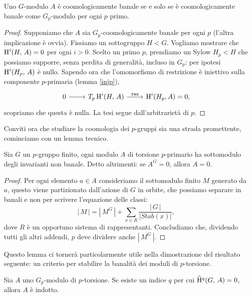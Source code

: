 \begin{lemma}\label{banSylow}
	Uno $ G $-modulo $ A $ è coomologicamente banale se e solo se è coomologicamente banale come $ G_p $-modulo per ogni $ p $ primo.
\end{lemma}
\begin{proof}
	Supponiamo che $ A $ sia $ G_p $-coomologicamente banale per ogni $ p $ (l'altra implicazione è ovvia). Fissiamo un sottogruppo $ H < G $. Vogliamo mostrare che
	$  \operatorname{H}^i(H, \, A) = 0 $ per ogni $ i > 0 $. Scelto un primo $ p $, prendiamo un Sylow $ H_p < H $ che possiamo supporre, senza perdita di generalità, incluso in $ G_p $: per ipotesi $ \operatorname{H}^i(H_p, \, A) $ è nullo.
	Sapendo ora che l'omomorfismo di restrizione è iniettivo sulla componente $ p $-primaria (lemma \ref{injp}),
	$$ \begin{tikzcd}
	0 \rar & T_p\HH^i(H, \, A) \rar["\Res"] & \HH^i(H_p, A) = 0,
	\end{tikzcd}  $$
	scopriamo che questa è nulla. La tesi segue dall'arbitrarietà di $ p $.
\end{proof}

Conviti ora che studiare la coomologia dei $ p $-gruppi sia una strada promettente, 
cominciamo con un lemma tecnico.

\begin{lemma}\label{ban1}
	Sia $ G $ un $ p $-gruppo finito, ogni modulo $ A $ di torsione $ p $-primario ha sottomodulo degli invarianti non banale. Detto altrimenti: se $ A^G = 0 $, allora $ A = 0 $.
\end{lemma}
\begin{proof}
	Per ogni elemento $ a \in A $ consideriamo il sottomodulo finito $ M $ generato da $ a $, questo viene partizionato dall'azione di $ G $ in orbite, che possiamo separare in banali e non per scrivere l'equazione delle classi:
	\[ |\,M\,| = |\, M^G\,| +\sum_{x \in R} \frac{|\,G\,|}{|Stab(x)|},  \]
	dove $ R $ è un opportuno sistema di rappresentanti. Concludiamo che, dividendo tutti gli altri addendi, $ p $ deve dividere anche $ |\, M^G \, | $.
\end{proof}

Questo lemma ci tornerà particolarmente utile nella dimostrazione del risultato seguente: un criterio per stabilire la banalità dei moduli di $ p $-torsione.

\begin{proposition} \label{ban2}
	Sia $ A $ uno $ G_p $-modulo di $ p $-torsione.
	Se esiste un indice $ q $ per cui $ \operatorname{\widehat{H}^\mathnormal{q}}(G, \, A) = 0 $, allora $ A $ è indotto.
\end{proposition}

